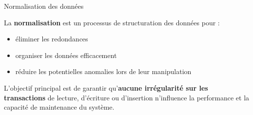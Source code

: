 \begin{frame}{Normalisation des données}

    \begin{definitionbox}
        La \textbf{normalisation} est un processus de structuration des données
        pour :
        \begin{itemize}
            \item éliminer les redondances
            \item organiser les données efficacement
            \item réduire les potentielles anomalies lors de leur manipulation
        \end{itemize}
    \end{definitionbox}

    \vspace{0.7cm}
    \pause

    L'objectif principal est de garantir qu'\textbf{aucune irrégularité sur les
    transactions} de lecture, d'écriture ou d'insertion n'influence la
    performance et la capacité de maintenance du système.

\end{frame}

